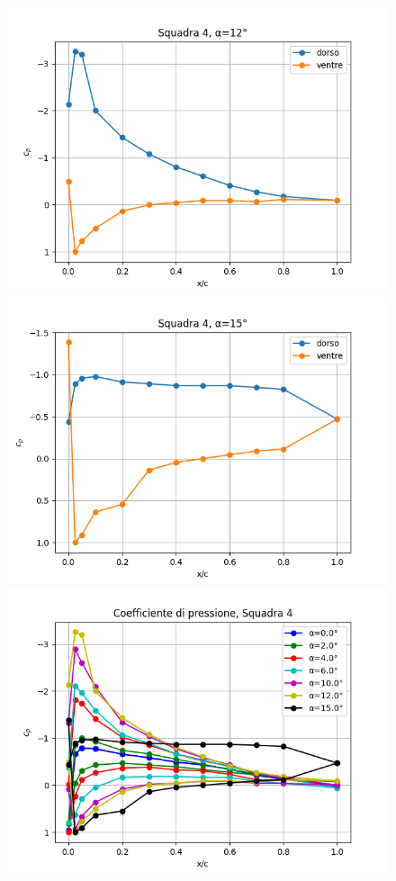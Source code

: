 \begin{figure}[H]
    \includegraphics[width=.49\textwidth]{images/5/cp4 a=12.png}
    \includegraphics[width=.49\textwidth]{images/5/cp4 a=15.png}
    \includegraphics[width=.49\textwidth]{images/5/cp4.png}
\end{figure}

